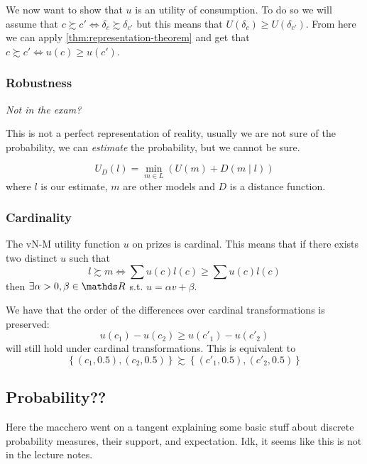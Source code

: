 \documentclass[12pt]{extarticle}
\begin{document}
We now want to show that $u$ is an utility of consumption.
To do so we will assume that $c \succsim c' \iff \delta_c \succsim \delta_{c'}$ but this means that $U(\delta_c) \geq U(\delta_{c'})$.
From here we can apply \cref{thm:representation-theorem} and get that $c \succsim c' \iff u(c) \geq u(c')$.

\subsubsection{Robustness}

\emph{Not in the exam?}

This is not a perfect representation of reality, usually we are not sure of the probability, we can \emph{estimate} the probability, but we cannot be sure.

\begin{equation}
	U_D(l) = \min_{m \in L} \left( U(m) + D(m \mid l) \right)
\end{equation}
where $l$ is our estimate, $m$ are other models and $D$ is a distance function.

\subsubsection{Cardinality}

The vN-M utility function $u$ on prizes is cardinal.
This means that if there exists two distinct $u$ such that
\begin{equation}
	l \succsim m \iff \sum u(c) l(c) \geq \sum u(c) l(c)
\end{equation}
then $\exists \alpha > 0, \beta \in \R$ s.t. $u = \alpha v + \beta$.

We have that the order of the differences over cardinal transformations is preserved:
\begin{equation}
	u(c_1) - u(c_2) \geq u(c'_1) - u(c'_2)
\end{equation}
will still hold under cardinal transformations.
This is equivalent to
\begin{equation}
	\left\{ (c_1, 0.5),  (c_2, 0.5) \right\} \succsim \left\{ (c'_1, 0.5),  (c'_2, 0.5) \right\}
\end{equation}

\subsection{Probability??}

Here the macchero went on a tangent explaining some basic stuff about discrete probability measures, their support, and expectation.
Idk, it seems like this is not in the lecture notes.
\end{document}
